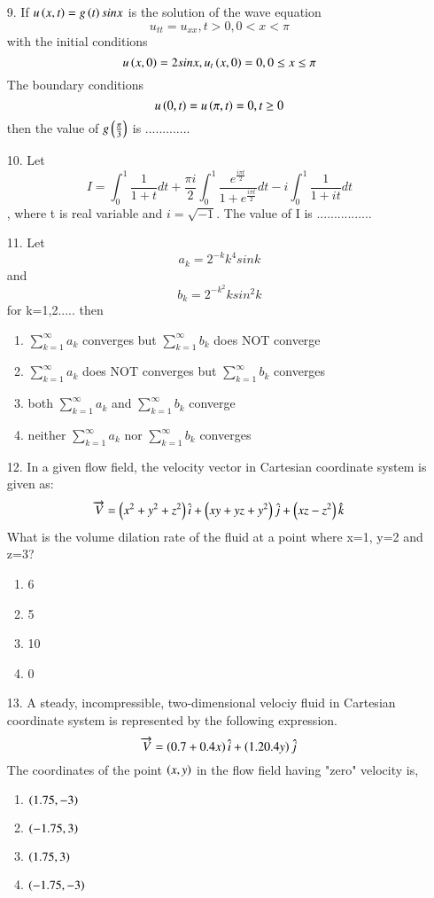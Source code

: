\documentclass[journal]{IEEEtran}
\begin{document}
\begin{enumerate}
\begin{enumerate}[label = (\Alph*)]
    \end{enumerate}
    \item[9.] If $u\left(x,t\right) = g\left(t\right)sinx$ is the solution of the wave equation\\$$u_{tt} = u_{xx}, t>0, 0<x<\pi$$ 
     with the initial conditions $$u\left(x,0\right)=2sinx, u_t\left(x,0\right)=0, 0\leq x\leq \pi$$ The boundary conditions $$u\left(0,t\right)=u\left(\pi,t\right)=0, t\geq 0$$then the value of $g\left(\frac{\pi}{3}\right)$ is .............
    \item[10.] Let $$I = \int_{0}^{1}\frac{1}{1+t}dt + \frac{\pi i}{2}\int_{0}^{1}\frac{e^{\frac{i\pi t}{2}}}{1+e^{\frac{i\pi t}{2}}}dt - i\int_{0}^{1}\frac{1}{1+it}dt$$, where t is real variable and $i = \sqrt{-1}$. The value of I is ................ 
    \item[11.] Let $$a_k = 2^{-k}k^4 sink  $$ and $$b_k = 2^{-k^2}ksin^2k$$ for k=1,2..... then
    \begin{enumerate}[label=(\Alph*)]
        \item $\sum_{k=1}^{\infty}a_k$ converges but $\sum_{k=1}^{\infty}b_k $ does NOT converge 
        \item $\sum_{k=1}^{\infty}a_k$ does NOT converges but $\sum_{k=1}^{\infty}b_k $ converges 
        \item both $\sum_{k=1}^{\infty}a_k$ and $\sum_{k=1}^{\infty}b_k $ converge 
        \item neither $\sum_{k=1}^{\infty}a_k$ nor $\sum_{k=1}^{\infty}b_k $ converges 
    \end{enumerate}
    \item[12.] In a given flow field, the velocity vector in Cartesian coordinate system is given as:$$\overrightarrow{V}=\left(x^2+y^2+z^2\right)\hat{i} +\left(xy+yz+y^2\right)\hat{j}+\left(xz-z^2\right)\hat{k}  $$What is the volume dilation rate of the fluid at a point where x=1, y=2 and z=3?
    \begin{enumerate}[label=(\Alph*)]
        \item 6
        \item 5
        \item 10
        \item 0
    \end{enumerate}
    \item[13.] A steady, incompressible, two-dimensional velociy fluid in Cartesian coordinate system is represented by the following expression.$$\overrightarrow{V} = \left(0.7+0.4x\right)\hat{i} + \left(1.2  0.4y\right)\hat{j}$$The coordinates of the point $\left(x,y\right)$ in the flow field having "zero" velocity is, 
    \begin{enumerate}[label=(\Alph*)]
        \item $\left(1.75,-3\right)$
        \item $\left(-1.75,3\right)$
        \item $\left(1.75,3\right)$
        \item $\left(-1.75,-3\right)$
    \end{enumerate}
\end{enumerate}
\end{document}
